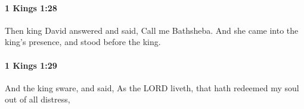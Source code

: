 		\paragraph{1 Kings 1:28} %
			\label{1KINGS-1-28}

			Then king David answered and said, Call me Bathsheba. And she came into the king’s presence, and stood before the king.


		\paragraph{1 Kings 1:29} %
			\label{1KINGS-1-29}

			And the king sware, and said, As the LORD liveth, that hath redeemed my soul out of all distress,



